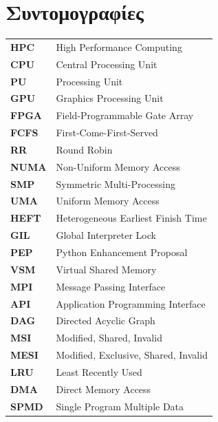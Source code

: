 \chapter*{Συντομογραφίες}
 
\begin{tabular}{ll}
  \textbf{HPC}   & High Performance Computing \\
  \textbf{CPU}   & Central Processing Unit \\
  \textbf{PU}    & Processing Unit \\
  \textbf{GPU}   & Graphics Processing Unit \\
  \textbf{FPGA}  & Field-Programmable Gate Array \\
  \textbf{FCFS}  & First-Come-First-Served \\
  \textbf{RR}    & Round Robin \\
  \textbf{NUMA}  & Non-Uniform Memory Access \\
  \textbf{SMP}   & Symmetric Multi-Processing \\
  \textbf{UMA}   & Uniform Memory Access \\
  \textbf{HEFT}  & Heterogeneous Earliest Finish Time \\
  \textbf{GIL}   & Global Interpreter Lock \\
  \textbf{PEP}   & Python Enhancement Proposal \\
  \textbf{VSM}   & Virtual Shared Memory \\
  \textbf{MPI}   & Message Passing Interface \\
  \textbf{API}   & Application Programming Interface \\
  \textbf{DAG}   & Directed Acyclic Graph \\
  \textbf{MSI}   & Modified, Shared, Invalid \\
  \textbf{MESI}  & Modified, Exclusive, Shared, Invalid \\
  \textbf{LRU}   & Least Recently Used \\
  \textbf{DMA}   & Direct Memory Access \\
  \textbf{SPMD}  & Single Program Multiple Data \\
\end{tabular}